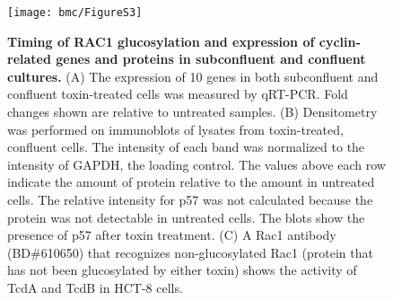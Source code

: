 \begin{figure}[h!]
  \centering
  \texttt{[image: bmc/FigureS3]}
  \caption[Timing of RAC1 glucosylation and expression of 
             cyclin-related genes and proteins in
             subconfluent and confluent cultures.]{
  \textbf{Timing of RAC1 glucosylation and expression of 
             cyclin-related genes and proteins in
             subconfluent and confluent cultures.}
  (A) The expression of 10 genes in both subconfluent
   and confluent toxin-treated cells was measured 
  by qRT-PCR. Fold changes shown are relative 
  to untreated samples.
  (B) Densitometry was performed on immunoblots 
  of lysates from toxin-treated, confluent cells. The 
  intensity of each band was normalized to the intensity 
  of GAPDH, the loading control. The values 
  above each row indicate the amount of protein relative 
  to the amount in untreated cells. The relative 
  intensity for p57 was not calculated because the protein 
  was not detectable in untreated cells. The 
  blots show the presence of p57 after toxin treatment.
  (C) A Rac1 antibody (BD\#610650) that recognizes 
  non-glucosylated Rac1 (protein that has not been 
  glucosylated by either toxin) shows the activity of 
  TcdA and TcdB in HCT-8 cells. }
  \label{bmc:figs3}
\end{figure}

\finishsupplement







